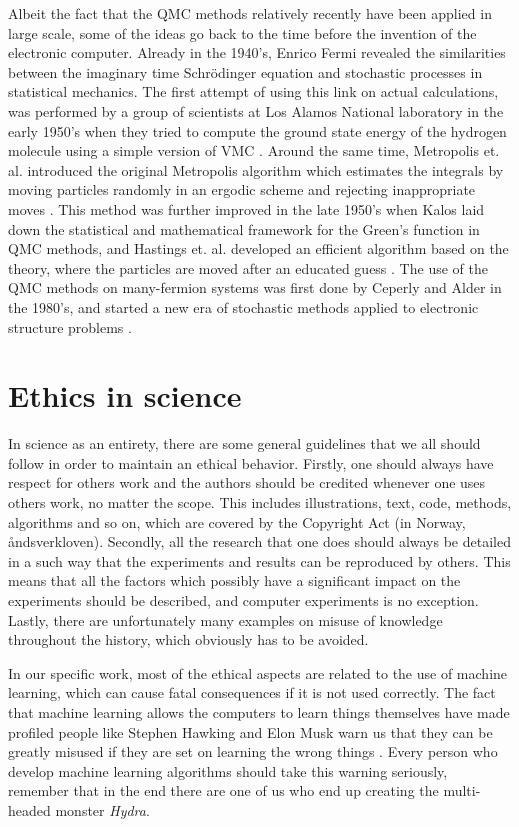 Albeit the fact that the QMC methods relatively recently have been applied in large scale, some of the ideas go back to the time before the invention of the electronic computer. Already in the 1940's, Enrico Fermi revealed the similarities between the imaginary time Schrödinger equation and stochastic processes in statistical mechanics. The first attempt of using this link on actual calculations, was performed by a group of scientists at Los Alamos National laboratory in the early 1950's when they tried to compute the ground state energy of the hydrogen molecule using a simple version of VMC \cite{bajdich_electronic_2010}. Around the same time, Metropolis et. al. introduced the original Metropolis algorithm which estimates the integrals by moving particles randomly in an ergodic scheme and rejecting inappropriate moves \cite{metropolis_monte_1949}. This method was further improved in the late 1950's when Kalos laid down the statistical and mathematical framework for the Green's function in QMC methods, and Hastings et. al. developed an efficient algorithm based on the theory, where the particles are moved after an educated guess \cite{hastings_monte_1970}. The use of the QMC methods on many-fermion systems was first done by Ceperly and Alder in the 1980's, and started a new era of stochastic methods applied to electronic structure problems \cite{ceperley_quantum_1986}. 

\section{Ethics in science}
In science as an entirety, there are some general guidelines that we all should follow in order to maintain an ethical behavior. Firstly, one should always have respect for others work and the authors should be credited whenever one uses others work, no matter the scope. This includes illustrations, text, code, methods, algorithms and so on, which are covered by the Copyright Act (in Norway, åndsverkloven). Secondly, all the research that one does should always be detailed in a such way that the experiments and results can be reproduced by others. This means that all the factors which possibly have a significant impact on the experiments should be described, and computer experiments is no exception. Lastly, there are unfortunately many examples on misuse of knowledge throughout the history, which obviously has to be avoided.

In our specific work, most of the ethical aspects are related to the use of machine learning, which can cause fatal consequences if it is not used correctly. The fact that machine learning allows the computers to learn things themselves have made profiled people like Stephen Hawking and Elon Musk warn us that they can be greatly misused if they are set on learning the wrong things \cite{cellan-jones_hawking:_2014, vance_elon_2015}. Every person who develop machine learning algorithms should take this warning seriously, remember that in the end there are one of us who end up creating the multi-headed monster \textit{Hydra}.

